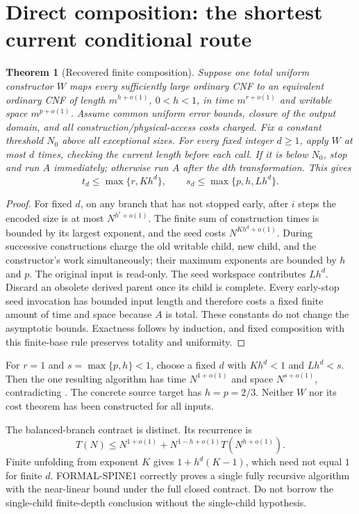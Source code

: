 \documentclass[11pt]{article}
\newtheorem{theorem}{Theorem}
\begin{document}
\section*{Direct composition: the shortest current conditional route}
\begin{theorem}[Recovered finite composition]\label{thm:single}
Suppose one total uniform constructor $W$ maps every sufficiently large
ordinary CNF to an equivalent ordinary CNF of length $m^{h+o(1)}$,
$0<h<1$, in time $m^{r+o(1)}$ and writable space $m^{p+o(1)}$.
Assume common uniform error bounds, closure of the output domain, and all
construction/physical-access costs charged. Fix a constant threshold $N_0$
above all exceptional sizes. For every fixed integer $d\ge1$, apply $W$
at most $d$ times, checking the current length before each call. If it is
below $N_0$, stop and run $A$ immediately; otherwise run $A$ after the
$d$th transformation. This gives
\[
 t_d\le\max\{r,Kh^d\},\qquad
 s_d\le\max\{p,h,Lh^d\}.
\]
\end{theorem}
\begin{proof}
For fixed $d$, on any branch that has not stopped early, after $i$ steps
the encoded size is at most $N^{h^i+o(1)}$.
The finite sum of construction times is bounded by its largest exponent,
and the seed costs $N^{Kh^d+o(1)}$. During successive constructions charge
the old writable child, new child, and the constructor's work simultaneously;
their maximum exponents are bounded by $h$ and $p$. The original input is
read-only. The seed workspace contributes $Lh^d$. Discard an obsolete
derived parent once its child is complete. Every early-stop seed invocation
has bounded input length and therefore costs a fixed finite amount of time
and space because $A$ is total. These constants do not change the asymptotic
bounds. Exactness follows by induction, and fixed composition with this
finite-base rule preserves totality and uniformity.
\end{proof}

For $r=1$ and $s=\max\{p,h\}<1$, choose a fixed $d$ with $Kh^d<1$
and $Lh^d<s$. Then the one resulting algorithm has time $N^{1+o(1)}$
and space $N^{s+o(1)}$, contradicting \cite[Corollary 3.3]{fortnow}.
The concrete source target has $h=p=2/3$. Neither $W$ nor its cost theorem
has been constructed for all inputs.

The balanced-branch contract is distinct. Its recurrence is
\[
 T(N)\le N^{1+o(1)}+N^{1-h+o(1)}T(N^{h+o(1)}).
\]
Finite unfolding from exponent $K$ gives $1+h^d(K-1)$, which need not equal
$1$ for finite $d$. FORMAL-SPINE1 correctly proves a single fully recursive
algorithm with the near-linear bound under the full closed contract.
Do not borrow the single-child finite-depth conclusion without the
single-child hypothesis.
\end{document}
